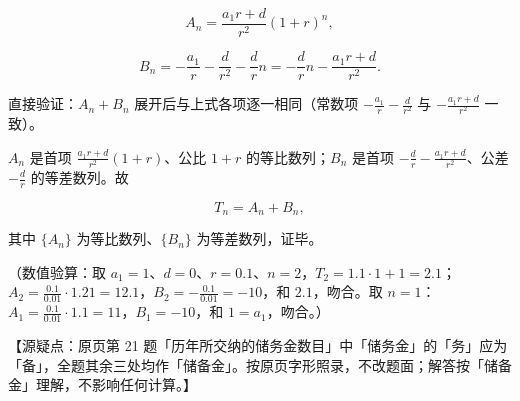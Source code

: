 \begin{answer}
\nopagebreak[4]
\[A_n=\frac{a_1r+d}{r^2}(1+r)^n,\]

\nopagebreak[4]
\[B_n=-\frac{a_1}{r}-\frac{d}{r^2}-\frac drn=-\frac drn-\frac{a_1r+d}{r^2}.\]

直接验证：$A_n+B_n$ 展开后与上式各项逐一相同（常数项 $-\frac{a_1}{r}-\frac{d}{r^2}$ 与 $-\frac{a_1r+d}{r^2}$ 一致）。

$A_n$ 是首项 $\frac{a_1r+d}{r^2}(1+r)$、公比 $1+r$ 的等比数列；$B_n$ 是首项 $-\frac dr-\frac{a_1r+d}{r^2}$、公差 $-\frac dr$ 的等差数列。故

\nopagebreak[4]
\[T_n=A_n+B_n,\]

其中 $\{A_n\}$ 为等比数列、$\{B_n\}$ 为等差数列，证毕。

（数值验算：取 $a_1=1$、$d=0$、$r=0.1$、$n=2$，$T_2=1.1\cdot1+1=2.1$；$A_2=\frac{0.1}{0.01}\cdot1.21=12.1$，$B_2=-\frac{0.1}{0.01}=-10$，和 $2.1$，吻合。取 $n=1$：$A_1=\frac{0.1}{0.01}\cdot1.1=11$，$B_1=-10$，和 $1=a_1$，吻合。）

【源疑点：原页第 21 题「历年所交纳的储务金数目」中「储务金」的「务」应为「备」，全题其余三处均作「储备金」。按原页字形照录，不改题面；解答按「储备金」理解，不影响任何计算。】


\end{answer}